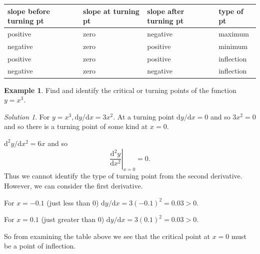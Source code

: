 \documentclass[
  english,
  11pt,
  oneside]{book}
\newcounter{none} %
\newcommand{\slide}{}
\theoremstyle{definition}
\theoremstyle{definition}
\newtheorem{example}{Example}[chapter]
\theoremstyle{definition}
\theoremstyle{definition}
\theoremstyle{remark}
\newtheorem*{solution}{Solution}
\begin{document}
{\def\LTcaptype{none} %
\begin{longtable}[]{@{}
  >{\raggedright\arraybackslash}p{}
  >{\raggedright\arraybackslash}p{}
  >{\raggedright\arraybackslash}p{}
  >{\raggedright\arraybackslash}p{}@{}}
\toprule\noalign{}
\begin{minipage}[b]{\linewidth}\raggedright
slope before turning pt
\end{minipage} & \begin{minipage}[b]{\linewidth}\raggedright
slope at turning pt
\end{minipage} & \begin{minipage}[b]{\linewidth}\raggedright
slope after turning pt
\end{minipage} & \begin{minipage}[b]{\linewidth}\raggedright
type of pt
\end{minipage} \\
\midrule\noalign{}
\endhead
\bottomrule\noalign{}
\endlastfoot
positive & zero & negative & maximum \\
negative & zero & positive & minimum \\
positive & zero & positive & inflection \\
negative & zero & negative & inflection \\
\end{longtable}
}

\slide

\begin{example}
Find and identify the critical or turning points of the function \(y=x^3\).
\end{example}

\begin{solution}
For \(y=x^3, \mathrm{d}y/\mathrm{d} x = 3x^2\). At a turning point \(\mathrm{d}y/\mathrm{d} x=0\) and so \(3x^2=0\) and so there is a turning point of some kind at \(x=0\).

\(\mathrm{d}^{2}y/\mathrm{d} x^2=6x\) and so
\[\left.\frac{\mathrm{d}^{2}y}{\mathrm{d} x^2}\right\vert_{x=0} = 0.\]
Thus we cannot identify the type of turning point from the second derivative.
However, we can consider the first derivative.

For \(x=-0.1\) (just less than \(0\)) \(\mathrm{d}y/\mathrm{d} x = 3(-0.1)^2 = 0.03>0\).

For \(x = 0.1\) (just greater than \(0\)) \(\mathrm{d}y/\mathrm{d} x=3(0.1)^2 = 0.03>0\).

So from examining the table above we see that the critical point at \(x=0\) must be a point of inflection.
\end{solution}
\end{document}
